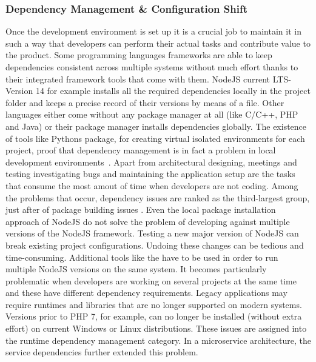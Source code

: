         \subsubsection{Dependency Management \& Configuration Shift}\label{sssec::dependency}
        Once the development environment is set up it is a crucial job to maintain it in such a way that developers can perform their actual tasks and contribute value to the product. Some programming languages frameworks are able to keep dependencies consistent across multiple systems without much effort thanks to their integrated framework tools that come with them. NodeJS current \ac{LTS}-Version 14 for example installs all the required dependencies locally in the project folder and keeps a precise record of their versions by means of a  file. Other languages either come without any package manager at all (like C/C++, PHP and Java) or their package manager installs dependencies globally. The existence of tools like Pythons  package, for creating virtual isolated environments for each project, proof that dependency management is in fact a problem in local development environments~\cite{pythonvenv}. Apart from architectural designing, meetings and testing investigating bugs and maintaining the application setup are the tasks that consume the most amout of time when developers are not coding. Among the problems that occur, dependency issues are ranked as the third-largest group, just after of package building issues \cite{setuppain}.\newline
        Even the local package installation approach of NodeJS do not solve the problem of developing against multiple versions of the NodeJS framework. Testing a new major version of NodeJS can break existing project configurations. Undoing these changes can be tedious and time-consuming. Additional tools like the  have to be used in order to run multiple NodeJS versions on the same system. It becomes particularly problematic when developers are working on several projects at the same time and these have different dependency requirements. Legacy applications may require runtimes and libraries that are no longer supported on modern systems. Versions prior to PHP 7, for example, can no longer be installed (without extra effort) on current Windows or Linux distributions. These issues are assigned into the runtime dependency management category. In a microservice architecture, the service dependencies further extended this problem. \newline
